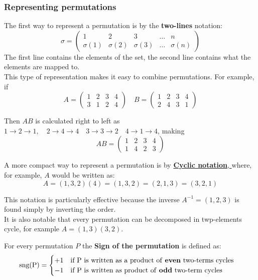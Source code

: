 \subsubsection{Representing permutations}
The first way to represent a permutation is by the \textbf{two-lines} notation:
\[
\sigma = \begin{pmatrix}
1 & 2 & 3 & \dots & n \\
\sigma(1) & \sigma(2) & \sigma(3) & \dots & \sigma(n)
\end{pmatrix}
\]
The first line contains the elements of the set, the second line contains what the elements are mapped to.
\\
This type of representation makes it easy to combine permutations. For example, if
 \[ 
  A = \begin{pmatrix} 
    1 & 2 & 3 & 4 \\ 
    3 & 1 & 2 & 4  
  \end{pmatrix}
 \quad 
  B = \begin{pmatrix} 
    1 & 2 & 3 & 4 \\ 
    2 & 4 & 3 & 1  
  \end{pmatrix}
  \]

Then $AB$ is calculated right to left as $1 \to 2 \to 1, \quad 2 \to 4 \to 4 \quad 3 \to 3 \to 2 \quad 4 \to 1 \to 4$, making
\[
  AB = \begin{pmatrix}
    1 & 2 & 3 & 4 \\
    1 & 4 & 2 & 3 
  \end{pmatrix}
\]

A more compact way to represent a permutation is by \href{https://en.wikipedia.org/wiki/Cyclic_permutation}{\textbf{Cyclic notation}, } where, for example, $A$ would be written as:
\[
  A = ( 1, 3 ,2 ) ( 4 ) =  (1, 3 ,2 ) = (2,1,3) = (3,2,1)
\]

This notation is particularly effective because the inverse $A^{-1} = (1,2,3)$ is found simply by inverting the order.
\\
It is also notable that every permutation can be decomposed in twp-elements cycle, for example $ A = (1,3)(3,2)$.
\begin{definition}
  For every permutation $P$ the \textbf{Sign of the permutation} is defined as:
  \[
    \text{sng(P)} = \begin{cases}  
      +1 \quad  \text{if P is written as a product of \textbf{even} two-terms cycles} \\
  -1 \quad \text{if P is written as product of \textbf{odd} two-term cycles}  
\end{cases}
  \]
\end{definition}

